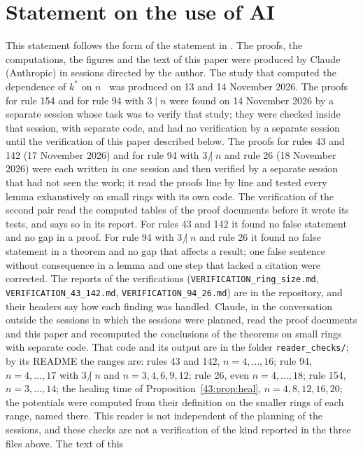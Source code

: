 \documentclass[10pt,a4paper]{article}
\newcommand{\kst}{k^{*}}
\newcommand{\ndiv}{\mathrel{\not|}}           %
\begin{document}
\begin{sloppypar}
\section*{Statement on the use of AI}
This statement follows the form of the statement in \cite{PeterleinNote}. The proofs, the computations, the
figures and the text of this paper were produced by Claude (Anthropic) in sessions directed by the author. The
study that computed the dependence of $\kst$ on $n$~\cite{PeterleinStudy} was produced on 13 and 14 November 2026.
The proofs for rule 154 and for rule 94 with $3\mid n$ were found on 14 November 2026 by a separate session whose
task was to verify that study; they were checked inside that session, with separate code, and had no verification
by a separate session until the verification of this paper described below. The proofs for rules 43 and 142 (17 November 2026) and for rule 94 with $3\ndiv n$ and
rule 26 (18 November 2026) were each written in one session and then verified by a separate session that had not
seen the work; it read the proofs line by line and tested every lemma exhaustively on small rings with its own code.
The verification of the second pair read the computed tables of the proof documents before it wrote its tests, and
says so in its report. For rules 43 and 142 it found no false statement and no gap in a proof. For rule 94 with $3\ndiv n$ and rule 26 it
found no false statement in a theorem and no gap that affects a result; one false sentence without consequence in a
lemma and one step that lacked a citation were corrected. The reports of the verifications
(\texttt{VERIFICATION\_ring\_size.md}, \texttt{VERIFICATION\_43\_142.md}, \texttt{VERIFICATION\_94\_26.md}) are in
the repository, and their headers say how each finding was handled. Claude, in the conversation outside the
sessions in which the sessions were planned, read the proof documents and this paper and recomputed the conclusions of the theorems
on small rings with separate code. That code and its output are in the folder \texttt{reader\_checks/}; by its
README the ranges are: rules 43 and 142, $n=4,\dots,16$; rule 94, $n=4,\dots,17$ with $3\ndiv n$ and
$n=3,4,6,9,12$; rule 26, even $n=4,\dots,18$; rule 154, $n=3,\dots,14$; the healing time of
Proposition~\ref{43:prop:heal}, $n=4,8,12,16,20$; the potentials were computed from their definition on the smaller
rings of each range, named there. This reader is not independent of the planning of the
sessions, and these checks are not a verification of the kind reported in the three files above. The text of this

\end{sloppypar}
\end{document}
